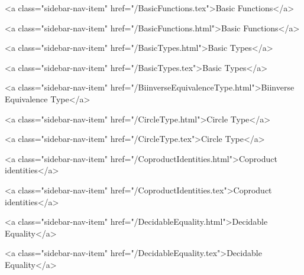           <a class="sidebar-nav-item" href="/BasicFunctions.tex">Basic Functions</a>
        
      
    
      
        
          <a class="sidebar-nav-item" href="/BasicFunctions.html">Basic Functions</a>
        
      
    
      
        
          <a class="sidebar-nav-item" href="/BasicTypes.html">Basic Types</a>
        
      
    
      
        
          <a class="sidebar-nav-item" href="/BasicTypes.tex">Basic Types</a>
        
      
    
      
        
          <a class="sidebar-nav-item" href="/BiinverseEquivalenceType.html">Biinverse Equivalence Type</a>
        
      
    
      
        
          <a class="sidebar-nav-item" href="/CircleType.html">Circle Type</a>
        
      
    
      
        
          <a class="sidebar-nav-item" href="/CircleType.tex">Circle Type</a>
        
      
    
      
        
          <a class="sidebar-nav-item" href="/CoproductIdentities.html">Coproduct identities</a>
        
      
    
      
        
          <a class="sidebar-nav-item" href="/CoproductIdentities.tex">Coproduct identities</a>
        
      
    
      
        
          <a class="sidebar-nav-item" href="/DecidableEquality.html">Decidable Equality</a>
        
      
    
      
        
          <a class="sidebar-nav-item" href="/DecidableEquality.tex">Decidable Equality</a>
        
      
    
